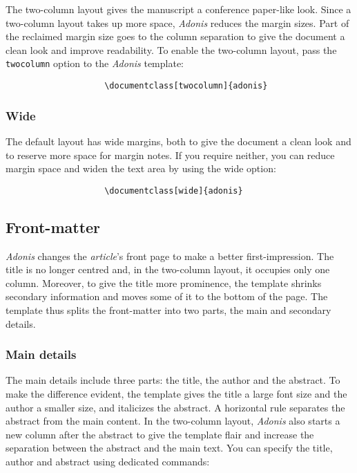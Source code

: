 \documentclass{adonis}
\begin{document}
				The two-column layout gives the manuscript a conference paper-like look.
				Since a two-column layout takes up more space, \textit{Adonis} reduces the margin sizes.
				Part of the reclaimed margin size goes to the column separation to give the document a clean look and improve readability.
				To enable the two-column layout, pass the \verb+twocolumn+ option to the \textit{Adonis} template:
			
				\begin{verbatim}
					\documentclass[twocolumn]{adonis}
				\end{verbatim}
			
			\subsubsection{Wide}
			
				The default layout has wide margins, both to give the document a clean look and to reserve more space for margin notes.
				If you require neither, you can reduce margin space and widen the text area by using the wide option:
			
				\begin{verbatim}
					\documentclass[wide]{adonis}
				\end{verbatim}
	
		\subsection{Front-matter}
		
			\textit{Adonis} changes the \textit{article}'s front page to make a better first-impression.
			The title is no longer centred and, in the two-column layout, it occupies only one column.
			Moreover, to give the title more prominence, the template shrinks secondary information and moves some of it to the bottom of the page.
			The template thus splits the front-matter into two parts, the main and secondary details.
			
			\subsubsection{Main details}
			
			The main details include three parts: the title, the author and the abstract.
			To make the difference evident, the template gives the title a large font size and the author a smaller size, and italicizes the abstract.
			A horizontal rule separates the abstract from the main content.
			In the two-column layout, \textit{Adonis} also starts a new column after the abstract to give the template flair and increase the separation between the abstract and the main text.
			You can specify the title, author and abstract using dedicated commands:
			
\end{document}

